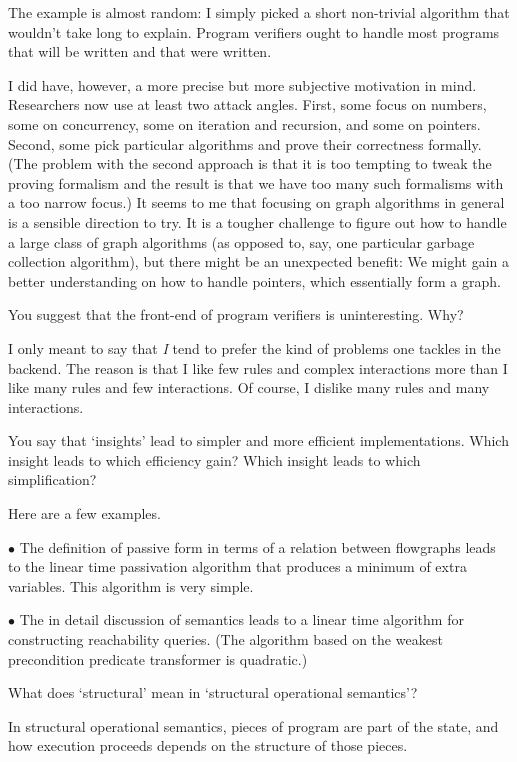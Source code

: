 \A The example is almost random: I simply picked a short non-trivial
algorithm that wouldn't take long to explain. Program verifiers ought to
handle most programs that will be written and that were written.

I did have, however, a more precise but more subjective motivation in mind.
Researchers now use at least two attack angles. First, some focus on
numbers, some on concurrency, some on iteration and recursion, and some on
pointers.  Second, some pick particular algorithms and prove their
correctness formally. (The problem with the second approach is that it is
too tempting to tweak the proving formalism and the result is that we have
too many such formalisms with a too narrow focus.) It seems to me that
focusing on graph algorithms in general is a sensible direction to try.  It
is a tougher challenge to figure out how to handle a large class of graph
algorithms (as opposed to, say, one particular garbage collection
algorithm), but there might be an unexpected benefit: We might gain a
better understanding on how to handle pointers, which essentially form a
graph.


\Q You suggest that the front-end of program verifiers is uninteresting.
Why?

\A I only meant to say that {\it I\/} tend to prefer the kind of problems
one tackles in the backend. The reason is that I like few rules and complex
interactions more than I like many rules and few interactions. Of course, I
dislike many rules and many interactions.

\Q You say that `insights' lead to simpler and more efficient
implementations.  Which insight leads to which efficiency gain? Which
insight leads to which simplification?

\A Here are a few examples.

\item{$\bullet$} The definition of passive form in terms of a relation
between flowgraphs leads to the linear time passivation algorithm that
produces a minimum of extra variables. This algorithm is very simple.

\item{$\bullet$} The in detail discussion of semantics leads to a linear
time algorithm for constructing reachability queries. (The algorithm based
on the weakest precondition predicate transformer is quadratic.)

\Q What does `structural' mean in `structural operational semantics'?

\A In structural operational semantics, pieces of program are part of the
state, and how execution proceeds depends on the structure of those pieces.

